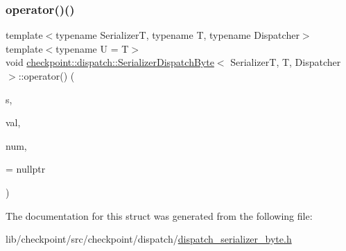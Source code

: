 \subsubsection{\texorpdfstring{operator()()}{operator()()}\hspace{0.1cm}{\footnotesize\ttfamily [2/2]}}
{\footnotesize\ttfamily template$<$typename SerializerT, typename T, typename Dispatcher$>$ \\
template$<$typename U  = T$>$ \\
void \hyperlink{structcheckpoint_1_1dispatch_1_1_serializer_dispatch_byte}{checkpoint\+::dispatch\+::\+Serializer\+Dispatch\+Byte}$<$ SerializerT, T, Dispatcher $>$\+::operator() (\begin{DoxyParamCaption}\item[{SerializerT \&}]{s,  }\item[{T $\ast$}]{val,  }\item[{\hyperlink{namespacecheckpoint_a083f6674da3f94c2901b18c6d238217c}{Serial\+Size\+Type}}]{num,  }\item[{\hyperlink{structcheckpoint_1_1dispatch_1_1_serializer_dispatch_byte_ab1c9cd927c357c30c095356c44252ccd}{is\+Not\+Byte\+Copy\+Type}$<$ U $>$ $\ast$}]{ = {\ttfamily nullptr} }\end{DoxyParamCaption})\hspace{0.3cm}{\ttfamily [inline]}}



The documentation for this struct was generated from the following file\+:\begin{DoxyCompactItemize}
\item 
lib/checkpoint/src/checkpoint/dispatch/\hyperlink{dispatch__serializer__byte_8h}{dispatch\+\_\+serializer\+\_\+byte.\+h}\end{DoxyCompactItemize}
